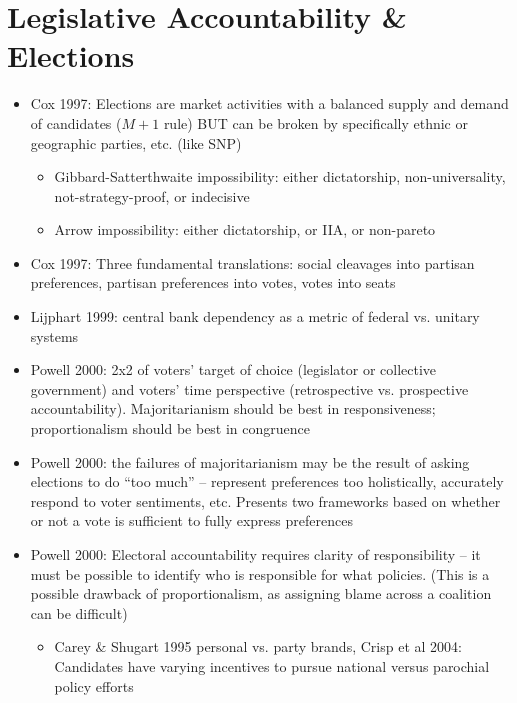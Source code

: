 \documentclass[12pt]{article}
\begin{document}
\section*{Legislative Accountability \& Elections}

\begin{itemize}
    \item Cox 1997: Elections are market activities with a balanced supply and demand of candidates ($M+1$ rule) BUT can be broken by specifically ethnic or geographic parties, etc. (like SNP)
    \begin{itemize}
        \item Gibbard-Satterthwaite impossibility: either dictatorship, non-universality, not-strategy-proof, or indecisive
        \item Arrow impossibility: either dictatorship, or IIA, or non-pareto
    \end{itemize}
    \item Cox 1997: Three fundamental translations: social cleavages into partisan preferences, partisan preferences into votes, votes into seats
    \item Lijphart 1999: central bank dependency as a metric of federal vs. unitary systems
    \item Powell 2000: 2x2 of voters' target of choice (legislator or collective government) and voters' time perspective (retrospective vs. prospective accountability). Majoritarianism should be best in responsiveness; proportionalism should be best in congruence
    \item Powell 2000: the failures of majoritarianism may be the result of asking elections to do ``too much'' -- represent preferences too holistically, accurately respond to voter sentiments, etc. Presents two frameworks based on whether or not a vote is sufficient to fully express preferences
    \item Powell 2000: Electoral accountability requires clarity of responsibility -- it must be possible to identify who is responsible for what policies. (This is a possible drawback of proportionalism, as assigning blame across a coalition can be difficult)
    \begin{itemize}
        \item Carey \& Shugart 1995 personal vs. party brands, Crisp et al 2004: Candidates have varying incentives to pursue national versus parochial policy efforts
    \end{itemize}
\end{itemize}
\end{document}
